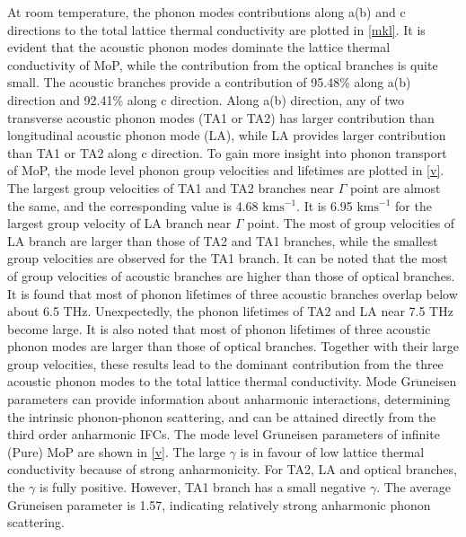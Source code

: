 \documentclass[twocolumn,showkeys,aps,prb,showpacs]{revtex4-1}
\begin{document}
At room temperature, the phonon modes contributions  along a(b) and c directions to the total lattice
thermal conductivity are plotted in \autoref{mkl}. It is evident that the  acoustic phonon modes
 dominate  the lattice thermal conductivity of MoP, while the contribution from the optical branches  is quite small.
The acoustic branches provide a contribution of 95.48\% along a(b) direction and 92.41\% along c direction.
Along a(b) direction, any of  two transverse acoustic phonon modes (TA1 or TA2) has  larger contribution than longitudinal acoustic phonon mode
(LA), while LA provides larger contribution than TA1 or TA2 along c direction.
To gain more insight into phonon transport  of MoP,  the mode level phonon group velocities
and lifetimes are plotted in \autoref{v}.
The largest  group velocities   of  TA1 and TA2 branches near $\Gamma$ point are almost the same, and the corresponding value is  4.68  $\mathrm{km s^{-1}}$.
It is 6.95 $\mathrm{km s^{-1}}$ for the largest  group velocity    of  LA branch near $\Gamma$ point.  The most of group
velocities of LA branch are larger than those of TA2 and TA1 branches, while the
smallest group  velocities are observed for the TA1 branch. It  can be noted that  the most of group
velocities of  acoustic branches are higher than those of optical branches.
It is found that most of   phonon lifetimes of three acoustic  branches  overlap below about 6.5 THz.
Unexpectedly,  the phonon lifetimes of  TA2 and LA  near 7.5 THz become large.
It is also noted that  most of  phonon lifetimes
of  three acoustic phonon modes are larger than those of
optical branches. Together with their large group velocities,
 these results lead to the dominant
contribution from the three
acoustic phonon modes  to the total lattice thermal conductivity.
Mode Gr$\mathrm{\ddot{u}}$neisen parameters can provide information about anharmonic interactions, determining the intrinsic phonon-phonon scattering,
and can be attained directly from the third
order anharmonic IFCs.  The mode level  Gr$\mathrm{\ddot{u}}$neisen parameters of  infinite (Pure) MoP are shown in \autoref{v}.
The large  $\gamma$ is in favour of low  lattice thermal conductivity because of strong anharmonicity.
For TA2, LA and optical  branches, the
$\gamma$ is fully positive. However, TA1 branch has  a small negative $\gamma$. The average  Gr$\mathrm{\ddot{u}}$neisen parameter is 1.57, indicating relatively strong anharmonic phonon scattering.
\end{document}
